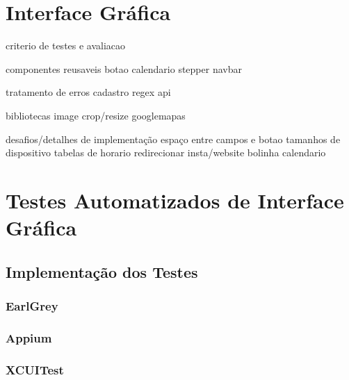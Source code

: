 \section{Interface Gráfica}

criterio de testes e avaliacao

componentes reusaveis
botao
calendario
stepper
navbar

tratamento de erros
cadastro
regex
api

bibliotecas
image crop/resize
googlemapas


desafios/detalhes de implementação
espaço entre campos e botao
tamanhos de dispositivo
tabelas de horario
redirecionar insta/website
bolinha calendario

\section{Testes Automatizados de Interface Gráfica}

\subsection{Implementação dos Testes}

\subsubsection{EarlGrey}

\subsubsection{Appium}

\subsubsection{XCUITest}
